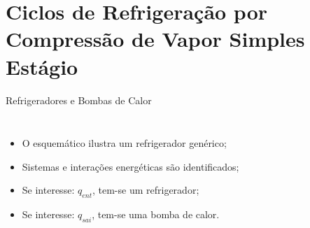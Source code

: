 
\section{Ciclos de Refrigeração por Compressão de Vapor Simples Estágio}

    \begin{frame}{Refrigeradores e Bombas de Calor}\vspace*{-0em}
        \begin{columns}
            \begin{itemize}
                \item<1-> O \alert{esquemático} ilustra um \alert{refrigerador genérico};
                    \\[\medskipamount]
                \item<1-> \alert{Sistemas} e \alert{interações energéticas} são identificados;
                    \\[\medskipamount]
                \item<2-> Se \alert{interesse}: \textcolor{green!50!black}{$q_{ent}$}, tem-se um
                    \alert{refrigerador};
					\\[\medskipamount]
                \item<2-> Se \alert{interesse}: \textcolor{green!50!black}{$q_{sai}$}, tem-se uma
                    \alert{bomba de calor}.
            \end{itemize}
		\end{columns}
    \end{frame}

